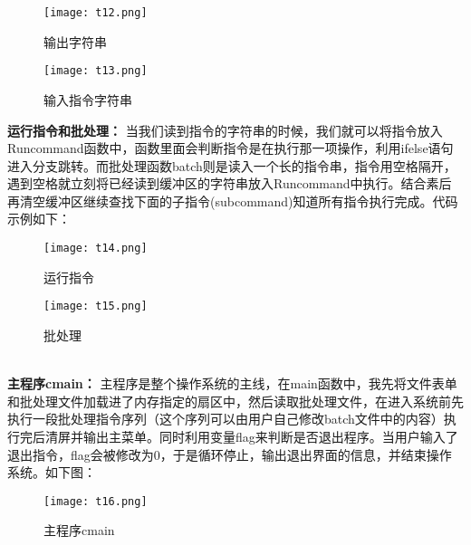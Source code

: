 \documentclass[UTF8]{article}
\begin{document}
\begin{enumerate}[1)]
\begin{enumerate}[i)]
		\begin{figure}[htbp]
			\begin{minipage}[t]{0.5\linewidth}
			\centering
			\texttt{[image: t12.png]}
			\caption{输出字符串}
			\end{minipage}
			\begin{minipage}[t]{0.5\linewidth}
				\centering
				\texttt{[image: t13.png]}
				\caption{输入指令字符串}
			\end{minipage}
		\end{figure}
		\newpage
		{{\bfseries 运行指令和批处理： }当我们读到指令的字符串的时候，我们就可以将指令放入Runcommand函数中，函数里面会判断指令是在执行那一项操作，利用ifelse语句进入分支跳转。而批处理函数batch则是读入一个长的指令串，指令用空格隔开，遇到空格就立刻将已经读到缓冲区的字符串放入Runcommand中执行。结合素后再清空缓冲区继续查找下面的子指令(subcommand)知道所有指令执行完成。代码示例如下：}
		\begin{figure}[htbp]
			\begin{minipage}[t]{0.5\linewidth}
			\centering
			\texttt{[image: t14.png]}
			\caption{运行指令}
			\end{minipage}
			\begin{minipage}[t]{0.5\linewidth}
				\centering
				\texttt{[image: t15.png]}
				\caption{批处理}
			\end{minipage}
		\end{figure}
	\\
{{\bfseries 主程序cmain： }主程序是整个操作系统的主线，在main函数中，我先将文件表单和批处理文件加载进了内存指定的扇区中，然后读取批处理文件，在进入系统前先执行一段批处理指令序列（这个序列可以由用户自己修改batch文件中的内容）执行完后清屏并输出主菜单。同时利用变量flag来判断是否退出程序。当用户输入了退出指令，flag会被修改为0，于是循环停止，输出退出界面的信息，并结束操作系统。如下图：}
		\begin{figure}[htbp]
			\centering
			\texttt{[image: t16.png]}
			\caption{主程序cmain}
		\end{figure}


\end{enumerate}
\end{enumerate}
\end{document}
